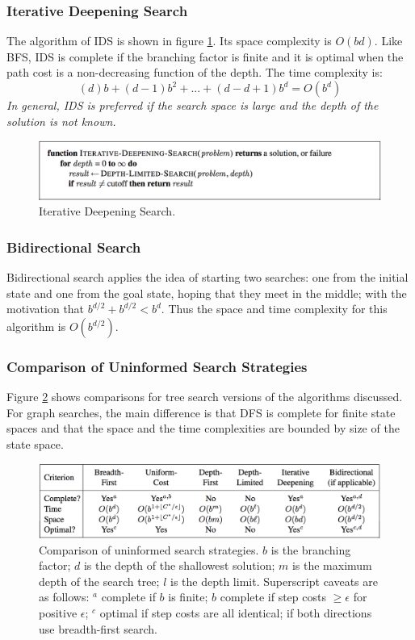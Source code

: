 \documentclass[twoside]{article}
\begin{document}
\subsubsection{Iterative Deepening Search}
The algorithm of IDS is shown in figure \ref{fig:ids}. Its space complexity
is \(O(bd)\). Like BFS, IDS is complete if the branching factor is finite and
it is optimal when the path cost is a non-decreasing function of the depth.
The time complexity is:
\begin{equation}
    (d)b + (d - 1)b^2 + ... + (d - d + 1)b^d = O(b^d)
\end{equation}
\emph{In general, IDS is preferred if the search space is large and the depth
of the solution is not known.}
\begin{figure}
  \includegraphics[width=\linewidth]{ids.png}
  \caption{Iterative Deepening Search.}
  \label{fig:ids}
\end{figure}
\subsubsection{Bidirectional Search}
Bidirectional search applies the idea of starting two searches: one from the
initial state and one from the goal state, hoping that they meet in the middle;
with the motivation that \(b^{d/2} + b^{d/2} < b^d\). Thus the space and time
complexity for this algorithm is \(O(b^{d/2})\).
\subsubsection{Comparison of Uninformed Search Strategies}
Figure \ref{fig:comparison} shows comparisons for tree search versions of the 
algorithms discussed. For graph searches, the main difference is that DFS is
complete for finite state spaces and that the space and the time complexities
are bounded by size of the state space.
\begin{figure}
  \includegraphics[width=\linewidth]{comparison.png}
  \caption{Comparison of uninformed search strategies. \(b\) is the branching 
  factor; \(d\) is the depth of the shallowest solution; \(m\) is the maximum depth 
  of the search tree; \(l\) is the depth limit. Superscript caveats are as follows:
  \(^a\) complete if \(b\) is finite; \(b\) complete if step costs \(\geq \epsilon\)
   for positive \(\epsilon\); \(^c\) optimal if step costs are all identical; 
  if both directions use breadth-first search.}
  \label{fig:comparison}
\end{figure}
\end{document}
